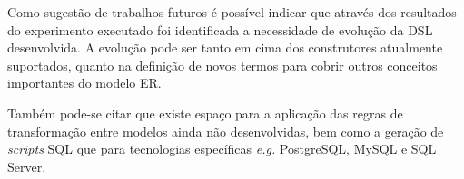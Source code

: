 Como sugestão de trabalhos futuros é possível indicar que através dos resultados do experimento executado foi identificada a necessidade de evolução da \ac{DSL} desenvolvida. 
A evolução pode ser tanto em cima dos construtores atualmente suportados, quanto na definição de novos termos para cobrir outros conceitos importantes do modelo \ac{ER}.

Também pode-se citar que existe espaço para a aplicação das regras de transformação entre modelos ainda não desenvolvidas, bem como a geração de \textit{scripts} \ac{SQL} que para tecnologias específicas \textit{e.g.} PostgreSQL, MySQL e SQL Server.






